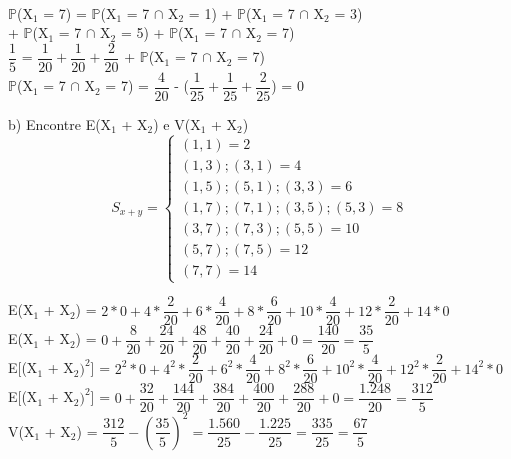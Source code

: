 \documentclass[12pt,a4paper,draft,final,oneside]{article}
\begin{document}
\begin{center}
		\vspace{1cm}\\
		$\mathbb{P}$(X$_{1}$ = 7) = $\mathbb{P}$(X$_{1}$ = 7 $\cap$ X$_{2}$ = 1) + $\mathbb{P}$(X$_{1}$ = 7 $\cap$ X$_{2}$ = 3)\\
		+ $\mathbb{P}$(X$_{1}$ = 7 $\cap$ X$_{2}$ = 5) + $\mathbb{P}$(X$_{1}$ = 7 $\cap$ X$_{2}$ = 7)
		\vspace{0.25cm}\\
		$\dfrac{1}{5}$ = $\dfrac{1}{20} + \dfrac{1}{20} + \dfrac{2}{20}$ + $\mathbb{P}$(X$_{1}$ = 7 $\cap$ X$_{2}$ = 7)
		\vspace{0.25cm}\\
		$\mathbb{P}$(X$_{1}$ = 7 $\cap$ X$_{2}$ = 7) = $\dfrac{4}{20}$ - ($\dfrac{1}{25} + \dfrac{1}{25} + \dfrac{2}{25}$) = 0
	\end{center}
	\vspace{1cm}
	b) Encontre E(X$_{1}$ + X$_{2}$) e V(X$_{1}$ + X$_{2}$)
	\vspace{0.5cm}
	\[
	S_{x+y} =
	\begin{cases}
	(1, 1) = 2 \\
	(1, 3); (3, 1) = 4\\
	(1, 5); (5, 1); (3, 3) = 6\\
	(1, 7); (7, 1); (3, 5); (5, 3) = 8\\
	(3,7); (7, 3); (5,5) = 10\\
	(5, 7); (7,5) = 12\\
	(7, 7) = 14
	\end{cases}
	\]
	\begin{center}
		\vspace{0.5cm}
		E(X$_{1}$ + X$_{2}$) = $2*0 + 4*\dfrac{2}{20} + 6*\dfrac{4}{20} + 8*\dfrac{6}{20} + 10*\dfrac{4}{20} + 12*\dfrac{2}{20} + 14*0$
		\vspace{0.25cm}\\
		E(X$_{1}$ + X$_{2}$) = $0 + \dfrac{8}{20} + \dfrac{24}{20} + \dfrac{48}{20} + \dfrac{40}{20} + \dfrac{24}{20} + 0 = \dfrac{140}{20} = \dfrac{35}{5}$
		\vspace{1cm}\\
		E[(X$_{1}$ + X$_{2})^2$] = $2^2*0 + 4^2*\dfrac{2}{20} + 6^2*\dfrac{4}{20} + 8^2*\dfrac{6}{20} + 10^2*\dfrac{4}{20} + 12^2*\dfrac{2}{20} + 14^2*0$
		\vspace{0.25cm}\\
		E[(X$_{1}$ + X$_{2})^2$] = $0 + \dfrac{32}{20} + \dfrac{144}{20} + \dfrac{384}{20} + \dfrac{400}{20} + \dfrac{288}{20} + 0 = \dfrac{1.248}{20} = \dfrac{312}{5}$
		\vspace{1cm}\\
		V(X$_{1}$ + X$_{2}$) = $\dfrac{312}{5} - (\dfrac{35}{5})^2 = \dfrac{1.560}{25} - \dfrac{1.225}{25} = \dfrac{335}{25} = \dfrac{67}{5}$
	\end{center}
\end{document}
